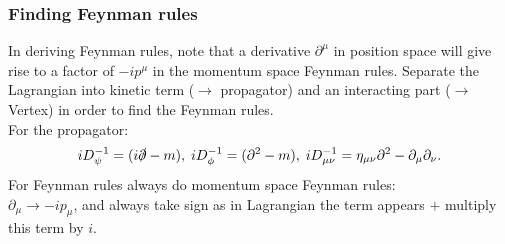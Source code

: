 \subsubsection{Finding Feynman rules}
In deriving Feynman rules, note that a derivative $\partial^\mu$ in position space will give rise to a factor of $-i p^\mu$ in the momentum space Feynman rules. Separate the Lagrangian into kinetic term ($\rightarrow$ propagator) and an interacting part ($\rightarrow$Vertex) in order to find the Feynman rules.\\
For the propagator:
\begin{equation}
	i D^{-1}_\psi= (i \slashed{\partial}-m), \; i D^{-1}_\phi = (\partial^2-m), \; iD^{-1}_{\mu \nu} = \eta_{\mu \nu} \partial^2 - \partial_\mu \partial_\nu.
\end{equation}
For Feynman rules always do momentum space Feynman rules:\\
$\partial_\mu \rightarrow -ip_\mu$, and always take sign as in Lagrangian the term appears $+$ multiply this term by $i$.
